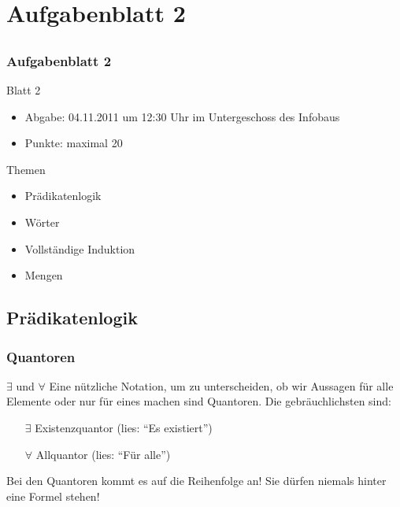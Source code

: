 \section[Blatt 2]{Aufgabenblatt 2}
\subsection*{}
\begin{frame}
        \frametitle{Aufgabenblatt 2}
        \begin{block}{Blatt 2}
					\begin{itemize}
						\item Abgabe: 04.11.2011 um 12:30 Uhr im Untergeschoss des Infobaus
						\item Punkte: maximal 20
					\end{itemize}
        \end{block}
        \begin{block}{Themen}
        \begin{itemize}
          \item Prädikatenlogik 
        	\item Wörter
        	\item Vollständige Induktion
        	\item Mengen
        \end{itemize}
        \end{block}
\end{frame}

\subsection{Prädikatenlogik}
\begin{frame}
	\frametitle{Quantoren}
	\begin{block}{$\exists$ und $\forall$}
	Eine nützliche Notation, um zu unterscheiden, ob wir Aussagen für alle Elemente oder nur für eines machen sind Quantoren. Die gebräuchlichsten sind:
	\begin{itemize}
		\item[$\exists$] Existenzquantor (lies: "`Es existiert"')
		\item[$\forall$] Allquantor (lies: "`Für alle"')
	\end{itemize}
	Bei den Quantoren kommt es auf die Reihenfolge an! Sie dürfen niemals hinter eine Formel stehen!
	\end{block}
\end{frame}

